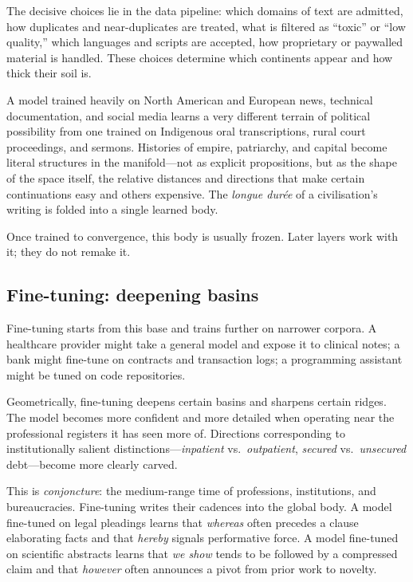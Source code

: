 \documentclass[12pt,a4paper]{article}
\begin{document}
The decisive choices lie in the data pipeline: which domains of text are admitted, how duplicates and near-duplicates are treated, what is filtered as ``toxic'' or ``low quality,'' which languages and scripts are accepted, how proprietary or paywalled material is handled. These choices determine which continents appear and how thick their soil is.

A model trained heavily on North American and European news, technical documentation, and social media learns a very different terrain of political possibility from one trained on Indigenous oral transcriptions, rural court proceedings, and sermons. Histories of empire, patriarchy, and capital become literal structures in the manifold---not as explicit propositions, but as the shape of the space itself, the relative distances and directions that make certain continuations easy and others expensive. The \emph{longue dur\'{e}e} of a civilisation's writing is folded into a single learned body.

Once trained to convergence, this body is usually frozen. Later layers work with it; they do not remake it.

\subsection*{Fine-tuning: deepening basins}

Fine-tuning starts from this base and trains further on narrower corpora. A healthcare provider might take a general model and expose it to clinical notes; a bank might fine-tune on contracts and transaction logs; a programming assistant might be tuned on code repositories.

Geometrically, fine-tuning deepens certain basins and sharpens certain ridges. The model becomes more confident and more detailed when operating near the professional registers it has seen more of. Directions corresponding to institutionally salient distinctions---\emph{inpatient} vs.\ \emph{outpatient}, \emph{secured} vs.\ \emph{unsecured} debt---become more clearly carved.

This is \emph{conjoncture}: the medium-range time of professions, institutions, and bureaucracies. Fine-tuning writes their cadences into the global body. A model fine-tuned on legal pleadings learns that \emph{whereas} often precedes a clause elaborating facts and that \emph{hereby} signals performative force. A model fine-tuned on scientific abstracts learns that \emph{we show} tends to be followed by a compressed claim and that \emph{however} often announces a pivot from prior work to novelty.
\end{document}
